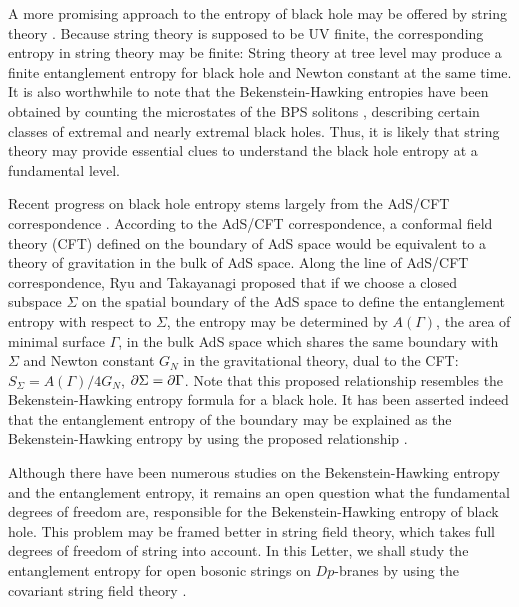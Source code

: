 \documentclass[aps,showpacs,showkeys]{revtex4}
\begin{document}
A more promising approach to the entropy of black hole may be offered by string theory \cite{Susskind1994U}. Because string theory is supposed to be UV finite, the corresponding entropy in string theory may be finite: String theory at tree level may produce a finite entanglement entropy for black hole and Newton constant at the same time. It is also worthwhile to note that the Bekenstein-Hawking entropies have been obtained \cite{Strominger1996V,Callan1996M,Horowitz1996S} by counting the microstates of the BPS solitons \cite{Cvetic1995Y,Youm1999}, describing certain classes of extremal and nearly extremal black holes. Thus, it is likely that string theory may provide essential clues to understand the black hole entropy
at a fundamental level.  

Recent progress on black hole entropy stems largely from the AdS/CFT correspondence \cite{Maldacena1998}. According to the AdS/CFT correspondence, a conformal field theory (CFT) defined on the boundary of AdS space would be equivalent to a theory of gravitation in the bulk of AdS space. 
Along the line of AdS/CFT correspondence, 
Ryu and Takayanagi \cite{Ryu2006T,Ryu2006TJHEP} proposed that if we choose a closed subspace $\Sigma$ on the spatial boundary of the AdS space to define the entanglement entropy with respect to $\Sigma$, the entropy may be determined by $A(\Gamma)$, the area of minimal surface $\Gamma$, in the bulk AdS space which shares the same boundary with $\Sigma$ and Newton constant $G_N$ in the gravitational theory, dual to the CFT: $S_{\Sigma} = A(\Gamma)/4G_N$, $\partial \Sigma = \partial \Gamma$. Note that this proposed relationship resembles the Bekenstein-Hawking entropy formula for a black hole. It has been asserted indeed that the entanglement entropy of the boundary may be explained as the Bekenstein-Hawking entropy by using the proposed relationship \cite{Azeyanagi2008}.     

Although there have been numerous studies on the Bekenstein-Hawking entropy and the entanglement 
entropy, it remains an open question what the fundamental degrees of freedom are, responsible for the 
Bekenstein-Hawking entropy of black hole. This problem may be framed better in string field theory,
which takes full degrees of freedom of string into account. 
In this Letter, we shall study the entanglement entropy for open bosonic strings on $Dp$-branes by 
using the covariant string field theory \cite{Lee1988,Lee2017d,Lee2017JKPS,Lee2017De}. 
\end{document}
